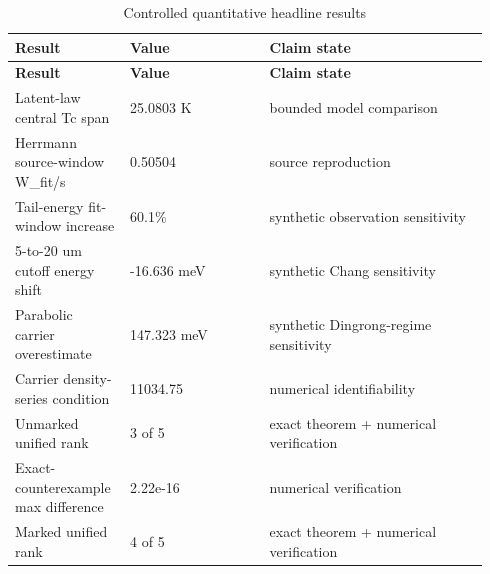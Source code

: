 \documentclass[12pt]{article}
\begin{document}
\begingroup
\scriptsize
\begin{longtable}{@{}p{0.220\linewidth}p{0.280\linewidth}p{0.440\linewidth}@{}}
\caption{Controlled quantitative headline results}\\
\toprule
\textbf{Result} & \textbf{Value} & \textbf{Claim state} \\
\midrule
\endfirsthead
\toprule
\textbf{Result} & \textbf{Value} & \textbf{Claim state} \\
\midrule
\endhead
Latent-law central Tc span & 25.0803 K & bounded model comparison \\
Herrmann source-window W\_fit/s & 0.50504 & source reproduction \\
Tail-energy fit-window increase & 60.1\% & synthetic observation sensitivity \\
5-to-20 um cutoff energy shift & -16.636 meV & synthetic Chang sensitivity \\
Parabolic carrier overestimate & 147.323 meV & synthetic Dingrong-regime sensitivity \\
Carrier density-series condition & 11034.75 & numerical identifiability \\
Unmarked unified rank & 3 of 5 & exact theorem + numerical verification \\
Exact-counterexample max difference & 2.22e-16 & numerical verification \\
Marked unified rank & 4 of 5 & exact theorem + numerical verification \\
\bottomrule
\end{longtable}
\endgroup
\end{document}
